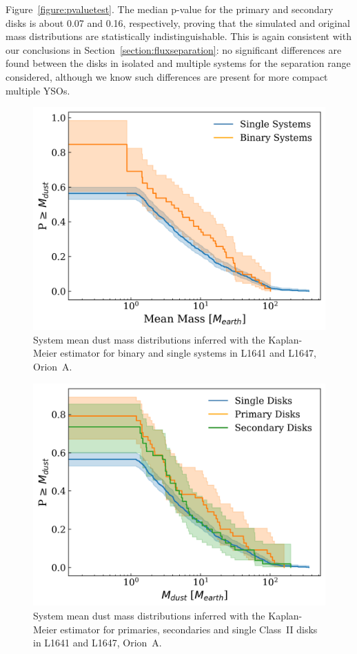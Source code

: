 \documentclass{aa}
\begin{document}
Figure~\ref{figure:pvaluetest}. The median p-value for the primary and secondary disks is about 0.07 and 0.16, respectively, proving that the simulated and original mass distributions are statistically indistinguishable. This is again consistent with our conclusions in Section~\ref{section:fluxseparation}: no significant differences are found between the disks in isolated and multiple systems for the separation range considered, although we know such differences are present for more compact multiple YSOs.


\begin{figure}
\centering
   \includegraphics[width=\columnwidth]{BSs_SODAVisionKounkel_MeanMass.png}
     \caption{System mean dust mass distributions inferred with the Kaplan-Meier estimator for binary and single systems in L1641 and L1647, Orion~A.}
     \label{figure:cumulativemass}
\end{figure}

\begin{figure}
\centering
   \includegraphics[width=\columnwidth]{New_PrimSecSingle.png}
     \caption{System mean dust mass distributions inferred with the Kaplan-Meier estimator for primaries, secondaries and single Class~II disks in L1641 and L1647, Orion~A.}
     \label{figure:sepbinaries}
\end{figure}
\end{document}
